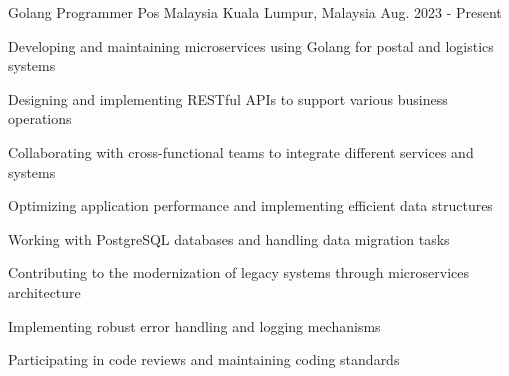 

\begin{cventries}

  \cventry
    {Golang Programmer} %
    {Pos Malaysia} %
    {Kuala Lumpur, Malaysia} %
    {Aug. 2023 - Present} %
    {
      \begin{cvitems} %
        \item Developing and maintaining microservices using Golang for postal and logistics systems
        \item Designing and implementing RESTful APIs to support various business operations
        \item Collaborating with cross-functional teams to integrate different services and systems
        \item Optimizing application performance and implementing efficient data structures
        \item Working with PostgreSQL databases and handling data migration tasks
        \item Contributing to the modernization of legacy systems through microservices architecture
        \item Implementing robust error handling and logging mechanisms
        \item Participating in code reviews and maintaining coding standards
      \end{cvitems}
    }


\end{cventries}
